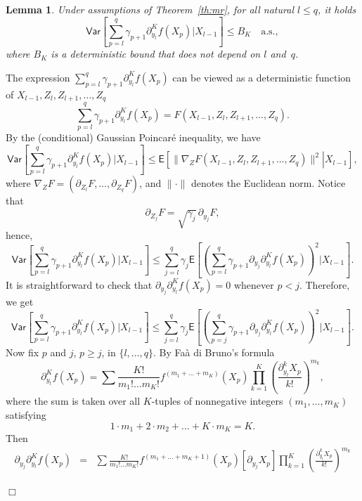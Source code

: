\documentclass[aap,preprint]{imsart}
\newcommand{\proofendsign}{$\Box$}
\newtheorem{lem}[thm]{Lemma}
\newenvironment{proof}{{\noindent \bf Proof }}
 {{\hspace*{\fill}\proofendsign\par\bigskip}}
\begin{document}
\begin{lem}
\label{lem:var_poincare}
Under assumptions of Theorem~\ref{th:mr},
for all natural $l\le q$, it holds
$$
\mathsf{Var}\left[\sum_{p=l}^{q}\gamma_{p+1}\partial_{y_{l}}^{K}f\left(X_{p}\right)\Big|X_{l-1}\right]\le B_K\quad\text{a.s.},
$$
where $B_K$ is a deterministic bound that does not depend on $l$ and~$q$.
\end{lem}

\begin{proof}
The expression
$\sum_{p=l}^q \gamma_{p+1} \partial_{y_l}^K f(X_p)$
can be viewed as a deterministic function of
$X_{l-1},Z_l,Z_{l+1},\ldots,Z_q$
$$
\sum_{p=l}^q \gamma_{p+1} \partial_{y_l}^K f(X_p)
=F(X_{l-1},Z_l,Z_{l+1},\ldots,Z_q).
$$
By the (conditional) Gaussian Poincar\'e inequality,
we have
$$
\mathsf{Var}\left[\sum_{p=l}^{q}\gamma_{p+1}\partial_{y_{l}}^{K}f\left(X_{p}\right)\Big|X_{l-1}\right]
\le\mathsf E\left[\left.
\|\nabla_Z F(X_{l-1},Z_l,Z_{l+1},\ldots,Z_q)\|^2
\right|X_{l-1}\right],
$$
where $\nabla_Z F=(\partial_{Z_l} F,\ldots,\partial_{Z_q} F)$,
and $\|\cdot\|$ denotes the Euclidean norm.
Notice that
$$
\partial_{Z_j} F=\sqrt{\gamma_j}\,\partial_{y_j} F,
$$
hence,
$$
\mathsf{Var}\left[\sum_{p=l}^{q}\gamma_{p+1}\partial_{y_{l}}^{K}f\left(X_{p}\right)\Big|X_{l-1}\right]\leq\sum_{j=l}^{q}\gamma_{j}\mathsf{E}\left[\left(\sum_{p=l}^{q}\gamma_{p+1}\partial_{y_{j}}\partial_{y_{l}}^{K}f\left(X_{p}\right)\right)^{2}\Big|X_{l-1}\right].
$$
It is straightforward to check that
$\partial_{y_j}\partial_{y_l}^K f(X_p)=0$
whenever $p<j$. Therefore, we get
\begin{equation}\label{eq:10062018a2}
\mathsf{Var}\left[\sum_{p=l}^{q}\gamma_{p+1}\partial_{y_{l}}^{K}f\left(X_{p}\right)\Big|X_{l-1}\right]\leq\sum_{j=l}^{q}\gamma_{j}\mathsf{E}\left[\left(\sum_{p=j}^{q}\gamma_{p+1}\partial_{y_{j}}\partial_{y_{l}}^{K}f\left(X_{p}\right)\right)^{2}\Big|X_{l-1}\right].
\end{equation}
Now fix $p$ and $j$, $p\ge j$, in $\{l,\ldots,q\}$.
By Fa\`a di Bruno's formula
\[
\partial_{y_{l}}^{K}f\left(X_{p}\right)=\sum\frac{K!}{m_{1}!\ldots m_{K}!}f^{(m_{1}+\ldots+m_{K})}(X_{p})\prod_{k=1}^{K}\left(\frac{\partial_{y_{l}}^{k}X_{p}}{k!}\right)^{m_{k}},
\]
where the sum is taken over all $K$-tuples of nonnegative integers
$(m_1,\ldots,m_K)$ satisfying
$$
1\cdot m_{1}+2\cdot m_{2}+\ldots+K\cdot m_{K}=K.
$$
Then
\begin{eqnarray*}
\partial_{y_{j}}\partial_{y_{l}}^{K}f\left(X_{p}\right)
&=&\sum\frac{K!}{m_{1}!\ldots m_{K}!}f^{(m_{1}+\ldots+m_{K}+1)}(X_{p})\left[\partial_{y_{j}}X_{p}\right]\prod_{k=1}^{K}\left(\frac{\partial_{y_{l}}^{k}X_{p}}{k!}\right)^{m_{k}} \\

\end{eqnarray*}
\end{proof}
\end{document}
